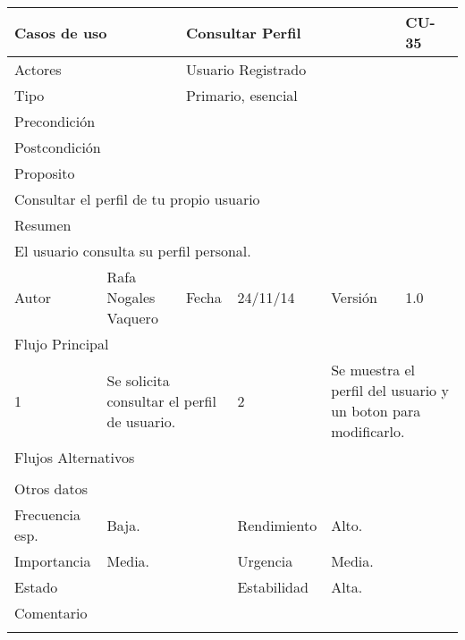 \documentclass{article}
\begin{document}
\begin{table}[h]
\begin{tabular}{|l|l|l|l|l|l|}
\hline
\multicolumn{2}{|p{2cm}|}{Casos de uso}  & \multicolumn{3}{p{7cm}|}{Consultar Perfil} & CU-35 \\
\hline
\multicolumn{2}{|p{2cm}|}{Actores}       & \multicolumn{4}{p{8cm}|}{Usuario Registrado}        \\
\hline
\multicolumn{2}{|p{2cm}|}{Tipo}          & \multicolumn{4}{p{8cm}|}{Primario, esencial}        \\
\hline
\multicolumn{2}{|p{2cm}|}{Precondición}  & \multicolumn{4}{p{8cm}|}{}        \\
\hline
\multicolumn{2}{|p{2cm}|}{Postcondición} & \multicolumn{4}{p{8cm}|}{}        \\
\hline
\multicolumn{6}{|p{10cm}|}{Proposito}                                   \\
\hline
\multicolumn{6}{|p{10cm}|}{Consultar el perfil de tu propio usuario}                                            \\
\hline
\multicolumn{6}{|p{10cm}|}{Resumen}                                 \\
\hline
\multicolumn{6}{|p{10cm}|}{El usuario consulta su perfil personal.}                                            \\
\hline
Autor         &       Rafa Nogales Vaquero        &  Fecha   &  24/11/14   &   Versión  & 1.0\\
\hline
\multicolumn{6}{|p{10cm}|}{Flujo Principal}\\
\hline
\multicolumn{1}{|p{1cm}|}{1} & \multicolumn{2}{p{3cm}}{Se solicita consultar el perfil de usuario.} & \multicolumn{1}{|p{1cm}|}{2} & \multicolumn{2}{p{3cm}|}{Se muestra el perfil del usuario y un boton para modificarlo.}\\
\hline
\multicolumn{6}{|p{10cm}|}{Flujos Alternativos}\\
\hline
\multicolumn{1}{|p{1cm}}{} & \multicolumn{5}{|p{9cm}|}{}\\
\hline
\multicolumn{6}{|p{10cm}|}{Otros datos}\\
\hline
\multicolumn{1}{|p{2cm}|}{Frecuencia esp.} & \multicolumn{2}{p{3cm}}{Baja.} & \multicolumn{1}{|p{2cm}|}{Rendimiento} & \multicolumn{2}{p{3cm}|}{Alto.}\\
\hline
\multicolumn{1}{|p{2cm}|}{Importancia} & \multicolumn{2}{p{3cm}}{Media.} & \multicolumn{1}{|p{2cm}|}{Urgencia} & \multicolumn{2}{p{3cm}|}{Media.}\\
\hline
\multicolumn{1}{|p{2cm}|}{Estado} & \multicolumn{2}{p{3cm}}{} & \multicolumn{1}{|p{2cm}|}{Estabilidad} & \multicolumn{2}{p{3cm}|}{Alta.}\\
\hline
\multicolumn{6}{|p{10cm}|}{Comentario}\\
\hline
\multicolumn{6}{|p{10cm}|}{}\\
\hline
\end{tabular}
\end{table}
\end{document}

